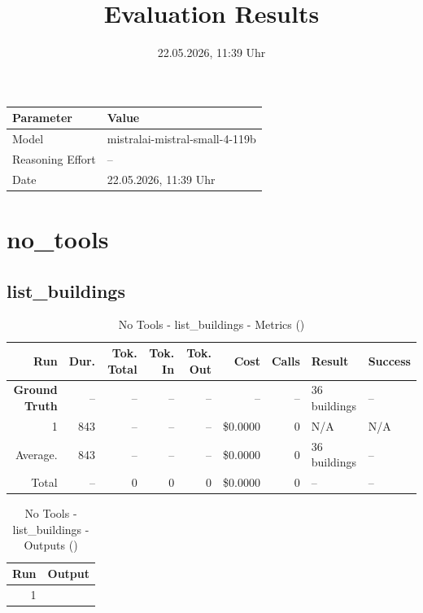 \documentclass[a4paper,11pt]{article}
\title{Evaluation Results}
\date{22.05.2026, 11:39 Uhr}
\begin{document}
\maketitle

\begin{table}[H]
\centering
\begin{tabular}{l l}
\toprule
\textbf{Parameter} & \textbf{Value} \\
\midrule
Model & mistralai-mistral-small-4-119b \\
Reasoning Effort & -- \\
Date & 22.05.2026, 11:39 Uhr \\
\bottomrule
\end{tabular}
\end{table}

\tableofcontents
\clearpage

\section{no\_tools}

\subsection{list\_buildings}

\begin{table}[ht]
\centering
\scriptsize
\caption{No Tools - list\_buildings - Metrics ()}
\label{tab:no\_tools\_list\_buildings\_metrics\_}
\begin{tabular}{r r r r r r r p{3cm} l}
\hline
Run & Dur. & Tok. Total & Tok. In & Tok. Out & Cost & Calls & Result & Success \\
\hline
\textbf{Ground Truth} & -- & -- & -- & -- & -- & -- & 36 buildings & -- \\
\hline
1 & 843 & -- & -- & -- & \$0.0000 & 0 & N/A & N/A \\
\hline
Average. & 843 & -- & -- & -- & \$0.0000 & 0 & 36 buildings & -- \\
Total & -- & 0 & 0 & 0 & \$0.0000 & 0 & -- & -- \\
\hline
\end{tabular}
\end{table}

\clearpage

\begin{table}[ht]
\centering
\scriptsize
\caption{No Tools - list\_buildings - Outputs ()}
\label{tab:no\_tools\_list\_buildings\_outputs\_}
\begin{tabular}{r p{12cm}}
\hline
Run & Output \\
\hline
1 &  \\
\hline
\end{tabular}
\end{table}

\clearpage
\end{document}
